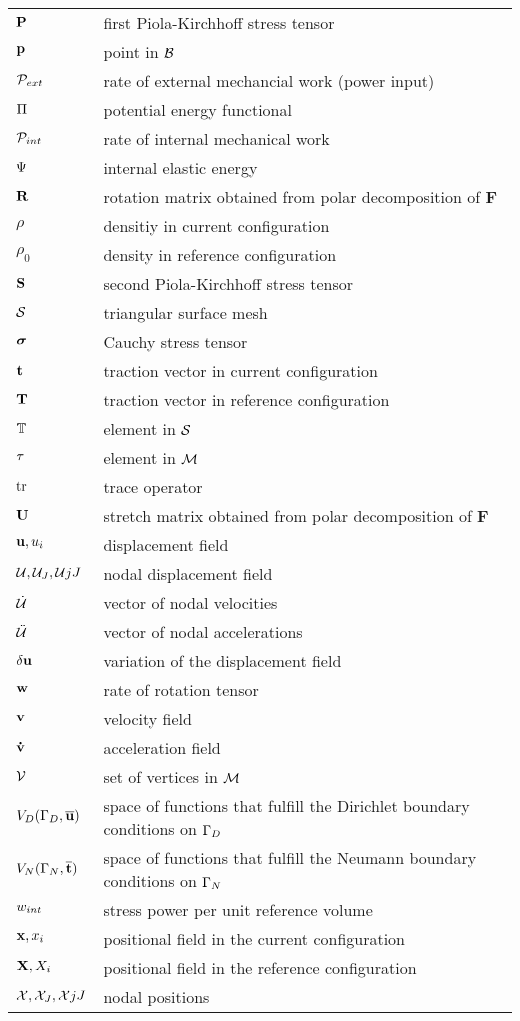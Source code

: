\begin{longtabu}{ R{2.4cm}  L{8cm} }
		$\mathbf {P} $ & first Piola-Kirchhoff stress tensor \\
		$\mathbf{p}$ & point in $\mathcal{B} $ \\
		$\mathcal P _{ext}$ & rate of external mechancial work (power input) \\
		$\Pi$ & potential energy functional\\
		$\mathcal P _{int}$ & rate of internal mechanical work \\
		$\Psi$ & internal elastic energy \\
		$\mathbf{R}$ & rotation matrix obtained from polar decomposition of $\mathbf F$\\
		$\rho$ & densitiy in current configuration \\
		$\rho_0$ & density in reference configuration \\
		$\mathbf {S} $ & second Piola-Kirchhoff stress tensor \\
		$\mathcal{S}$ & triangular surface mesh \\
		$\boldsymbol{\sigma}$ & Cauchy stress tensor\\
		$\mathbf {t} $ & traction vector in current configuration\\
		$\mathbf {T} $ & traction vector in reference configuration\\
		$\mathbb{T}$& element in $\mathcal{S}$\\
		$\tau$ & element in $\mathcal{M}$ \\
		$\textnormal{tr} $ & trace operator \\
		$\mathbf {U }$ & stretch matrix obtained from polar decomposition of $\mathbf F$\\
     $\mathbf {u} ,u_i $& displacement field \\
		$\mathcal{U} , \mathcal{U} _J, \mathcal{U} {jJ}$ & nodal displacement field \\
		${\mathcal{\dot{U}}}$& vector of nodal velocities \\
		${\mathcal{\ddot{U}}}$& vector of nodal accelerations \\
		$\delta \mathbf {u} $ & variation of the displacement field\\
		$\mathbf {w} $ & rate of rotation tensor \\
		$\mathbf {v} $ & velocity field	\\
		$\mathbf {\dot v} $ & acceleration field	\\
		$\mathcal{V}$ & set of vertices in $\mathcal{M}$ \\		
		$V_D(\Gamma _D,\overline{\mathbf {u} })$ & space of functions that fulfill the Dirichlet boundary conditions on $\Gamma _D$\\
		$V_N(\Gamma _N,\overline{\mathbf {t} })$ & space of functions that fulfill the Neumann boundary conditions on $\Gamma _N$\\
		
		$w_{int}$ & stress power per unit reference volume \\
		$\mathbf {x} ,x_i$& positional field in the current configuration \\
		$\mathbf {X} ,X_i $& positional field in the reference configuration \\
		$\mathcal{X} , \mathcal{X} _J, \mathcal{X} {jJ}$ & nodal positions \\
		
		
		
    \end{longtabu}







